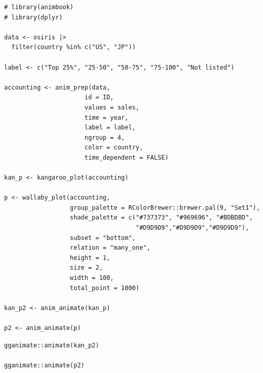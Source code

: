 \begin{verbatim}
# library(animbook)
# library(dplyr)

data <- osiris |> 
  filter(country %in% c("US", "JP"))

label <- c("Top 25%", "25-50", "50-75", "75-100", "Not listed")

accounting <- anim_prep(data, 
                      id = ID, 
                      values = sales, 
                      time = year, 
                      label = label, 
                      ngroup = 4, 
                      color = country, 
                      time_dependent = FALSE)

kan_p <- kangaroo_plot(accounting)

p <- wallaby_plot(accounting,
                  group_palette = RColorBrewer::brewer.pal(9, "Set1"),
                  shade_palette = c("#737373", "#969696", "#BDBDBD",
                                    "#D9D9D9","#D9D9D9","#D9D9D9"),
                  subset = "bottom",
                  relation = "many_one",
                  height = 1,
                  size = 2,
                  width = 100,
                  total_point = 1000)

kan_p2 <- anim_animate(kan_p)

p2 <- anim_animate(p)
\end{verbatim}

\begin{verbatim}
gganimate::animate(kan_p2)

gganimate::animate(p2)
\end{verbatim}

